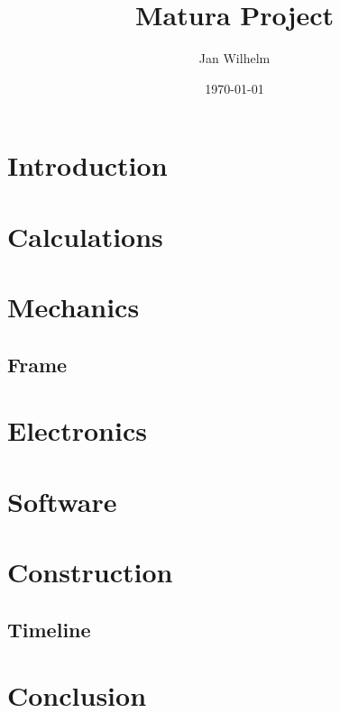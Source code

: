 \documentclass[11pt]{report}
\title{Matura Project}
\author{Jan Wilhelm}
\date\today
\begin{document}
    \maketitle

    \tableofcontents
    \newpage


    \chapter{Introduction}\label{ch:introduction}
    


    \chapter{Calculations}\label{ch:calculations}
    


    \chapter{Mechanics}\label{ch:mechanics}
    


    \section{Frame}\label{sec:frame}


    \chapter{Electronics}\label{ch:electronics}


    \chapter{Software}\label{ch:software}
    


    \chapter{Construction}\label{ch:construction}


    \section{Timeline}\label{sec:timeline}


    \chapter{Conclusion}\label{ch:conclusion}
\end{document}
